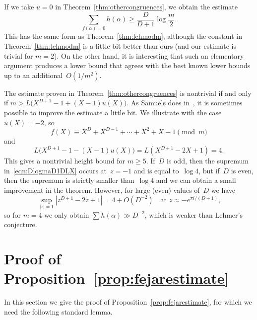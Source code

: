 \begin{remark}
If we take $u=0$ in  Theorem~\ref{thm:othercongruences}, we obtain
the estimate
\[
  \sum_{f({\alpha})=0} h({\alpha}) \ge \frac{D}{D+1}\log\frac{m}{2}.
\]
This has the same form as Theorem~\ref{thm:lehmodm}, although the
constant in Theorem~\ref{thm:lehmodm} is a little bit better than ours
(and our estimate is trivial for $m=2$).  On the other hand, it is
interesting that such an elementary argument produces a lower bound
that agrees with the best known lower
bounds~\cite{BoDoMo,BoHaMo,DuMo,GaIsMoPiWi} up to an
additional~$O(1/m^2)$.
\end{remark}

\begin{remark}
The estimate proven in Theorem~\ref{thm:othercongruences} is
nontrivial if and only if $m>L\bigl(X^{D+1}-1+(X-1)u(X)\bigr)$.  As
Samuels does in~\cite{MR2313990}, it is sometimes possible to improve
the estimate a little bit. We illustrate with the case $u(X)=-2$, so
\[
  f(X)\equiv X^D+X^{D-1}+\cdots+X^2+X-1\pmod{m}
\]
and
\[
  L\bigl(X^{D+1}-1-(X-1)u(X)\bigr)  =  L(X^{D+1}-2X+1)=4.
\]
This gives a nontrivial height bound for $m\ge5$.  If~$D$ is odd,
then the supremum in~\eqref{eqn:DlogmaD1DLX} occurs at~$z=-1$ and is
equal to~$\log4$, but if~$D$ is even, then the supremum is strictly
smaller than~$\log4$ and we can obtain a small improvement in the
theorem.  However, for large (even) values of~$D$ we have
\[
   \sup_{|z|=1}  |z^{D+1}-2z+1| = 4+O(D^{-2})
  \quad \text{at $z\approx -e^{\pi i/(D+1)}$,}
\]
so for $m=4$ we only obtain $\sum h({\alpha}) \gg D^{-2}$, which is weaker
than Lehmer's conjecture.
\end{remark}

\section{Proof of Proposition~\ref{prop:fejarestimate}}
\label{section:fejarproof}

In this section we give the proof of
Proposition~\ref{prop:fejarestimate}, for which we need the
following standard lemma.

